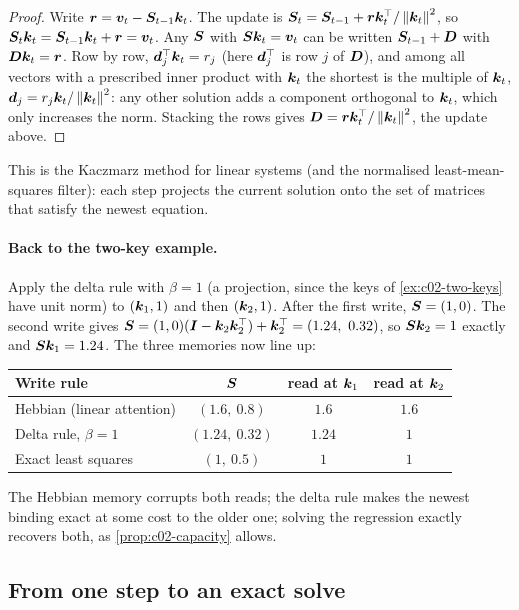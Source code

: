 \begin{proof}
Write $\bm{r} = \bm{v}_t - \bm{S}_{t-1}\bm{k}_t$. The update is $\bm{S}_t = \bm{S}_{t-1} + \bm{r}\bm{k}_t^{\top}/\left\lVert \bm{k}_t\right\rVert^2$,
so $\bm{S}_t\bm{k}_t = \bm{S}_{t-1}\bm{k}_t + \bm{r} = \bm{v}_t$. Any $\bm{S}$ with $\bm{S}\bm{k}_t = \bm{v}_t$ can be written
$\bm{S}_{t-1} + \bm{D}$ with $\bm{D}\bm{k}_t = \bm{r}$. Row by row, $\bm{d}_j^{\top}\bm{k}_t = r_j$ (here $\bm{d}_j^{\top}$ is row $j$
of $\bm{D}$), and among all vectors with a prescribed inner product with $\bm{k}_t$ the shortest is the
multiple of $\bm{k}_t$, $\bm{d}_j = r_j\bm{k}_t/\left\lVert \bm{k}_t\right\rVert^2$: any other solution adds a component
orthogonal to $\bm{k}_t$, which only increases the norm. Stacking the rows gives
$\bm{D} = \bm{r}\bm{k}_t^{\top}/\left\lVert \bm{k}_t\right\rVert^2$, the update above.
\end{proof}

This is the Kaczmarz method for linear systems (and the normalised least-mean-squares filter): each
step projects the current solution onto the set of matrices that satisfy the newest equation.

\paragraph{Back to the two-key example.} Apply the delta rule with $\beta = 1$ (a projection,
since the keys of \cref{ex:c02-two-keys} have unit norm) to $(\bm{k}_1, 1)$ and then $(\bm{k}_2, 1)$.
After the first write, $\bm{S} = (1, 0)$. The second write gives
$\bm{S} = (1, 0)(\bm{I} - \bm{k}_2\bm{k}_2^{\top}) + \bm{k}_2^{\top} = (1.24,\ 0.32)$, so $\bm{S}\bm{k}_2 = 1$ exactly and
$\bm{S}\bm{k}_1 = 1.24$. The three memories now line up:
\begin{center}\small
\begin{tabular}{@{}lccc@{}}
\toprule
Write rule & $\bm{S}$ & read at $\bm{k}_1$ & read at $\bm{k}_2$ \\
\midrule
Hebbian (linear attention) & $(1.6,\ 0.8)$ & $1.6$ & $1.6$ \\
Delta rule, $\beta = 1$ & $(1.24,\ 0.32)$ & $1.24$ & $1$ \\
Exact least squares & $(1,\ 0.5)$ & $1$ & $1$ \\
\bottomrule
\end{tabular}
\end{center}
The Hebbian memory corrupts both reads; the delta rule makes the newest binding exact at some cost
to the older one; solving the regression exactly recovers both, as \cref{prop:c02-capacity}
allows.

\subsection{From one step to an exact solve}

